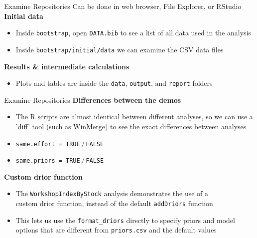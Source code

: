 \documentclass[aspectratio=169]{beamer}
\begin{document}
\begin{frame}{Examine Repositories}
  Can be done in {\darkgreen web browser}, {\darkgreen File Explorer}, or
  {\darkgreen RStudio}\\[4ex]
  {\bf\darkgreen Initial data}\\[1ex]
  \begin{itemize}
    \item[] Inside {\tt bootstrap}, open {\tt\darkgreen DATA.bib} to see a list
    of all data used in the analysis\\[2ex]
    \item[] Inside {\tt bootstrap/initial/data} we can examine the
    {\darkgreen CSV data files}\\[2ex]
  \end{itemize}
  \vspace{3ex}
  {\bf\darkgreen Results \& intermediate calculations}\\[1ex]
  \begin{itemize}
    \item[] {\darkgreen Plots} and {\darkgreen tables} are inside the
    {\tt data}, {\tt output}, and {\tt report} folders\\[2ex]
  \end{itemize}
\end{frame}


\begin{frame}[fragile]{Examine Repositories}
  \textbf{\darkgreen Differences between the demos}\\[0.6ex]
  \begin{itemize}
    \item[] The R scripts are almost identical between different analyses, so we
    can use a\\
    '{\darkgreen diff}' tool (such as {\darkgreen WinMerge}) to see the exact
    differences between analyses\\[1.2ex]
    \item[] {\tt {\darkgreen same.effort} = TRUE}$\,/\,${\tt FALSE}\\[0.6ex]
    \item[] {\tt {\darkgreen same.priors} = TRUE}$\,/\,${\tt FALSE}\\[0.6ex]
  \end{itemize}
  \vspace{3ex}
  \textbf{\darkgreen Custom drior function}\\[0.6ex]
  \begin{itemize}
    \item[] The {\tt WorkshopIndexByStock} analysis demonstrates the use
    of a\\
    {\darkgreen custom drior function}, instead of the default
    {\tt\darkgreen addDriors} function\\[1.5ex]
    \item[] This lets us use the \verb|format_driors| directly to specify priors
    and model options that are different from {\tt\darkgreen priors.csv} and the
    default values
  \end{itemize}
\end{frame}
\end{document}

